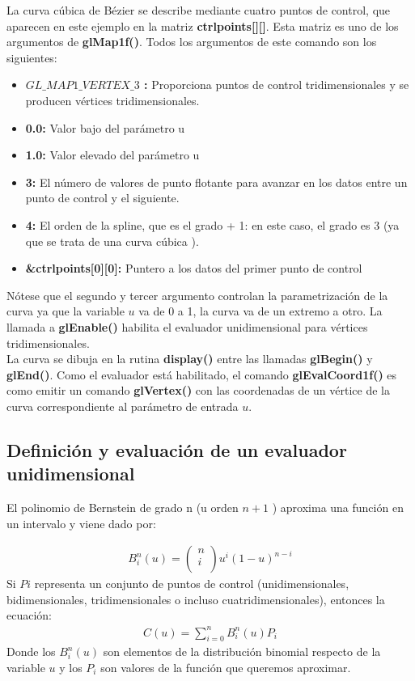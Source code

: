 La curva cúbica de Bézier se describe mediante cuatro puntos de control, que aparecen en este ejemplo en la matriz \textbf{ctrlpoints[][]}. Esta matriz es uno de los argumentos de \textbf{glMap1f()}. Todos los argumentos de este comando son los siguientes:\\
\begin{itemize}
    \item \textbf{$GL\_MAP1\_VERTEX\_3$ :} Proporciona puntos de control tridimensionales y se producen vértices tridimensionales.
    \item \textbf{0.0: } Valor bajo del parámetro u
    \item \textbf{1.0: } Valor elevado del parámetro u
    \item \textbf{3: } El número de valores de punto flotante para avanzar en los datos entre un punto de control y el siguiente.
    \item \textbf{4: } El orden de la spline, que es el grado + 1: en este caso, el grado es 3 (ya que se trata de una curva cúbica ).
    \item \textbf{\&ctrlpoints[0][0]: } Puntero a los datos del primer punto de control
\end{itemize}
Nótese que el segundo y tercer argumento controlan la parametrización de la curva ya que la variable $u$ va de 0 a 1, la curva va de un extremo a otro. La llamada a \textbf{glEnable()} habilita el evaluador unidimensional para vértices tridimensionales. \\

La curva se dibuja en la rutina \textbf{display()} entre las llamadas \textbf{glBegin()} y \textbf{glEnd()}. Como el evaluador está habilitado, el comando \textbf{glEvalCoord1f()} es como emitir un comando \textbf{glVertex()} con las coordenadas de un vértice de la curva correspondiente al parámetro de entrada $u$.

\subsection{Definición y evaluación de un evaluador unidimensional}
El polinomio de Bernstein de grado n (u orden $n+1$ ) aproxima una función en un intervalo y viene dado por:

\begin{align*}
B_i^n\left(u\right)=\left(\begin{matrix}n\\i\\\end{matrix}\right)u^i\left(1-u\right)^{n-i}
\end{align*}
Si $Pi$ representa un conjunto de puntos de control (unidimensionales, bidimensionales, tridimensionales o incluso cuatridimensionales), entonces la ecuación:
\begin{align*}
C\left(u\right)=\sum_{i=0}^{n}{B_i^n\left(u\right)}P_i
\end{align*}
Donde los ${\displaystyle B_{i}^{n}(u)}$ son elementos de la distribución binomial respecto de la variable $u$ y los $P_{i}$ son valores de la función que queremos aproximar.\\

